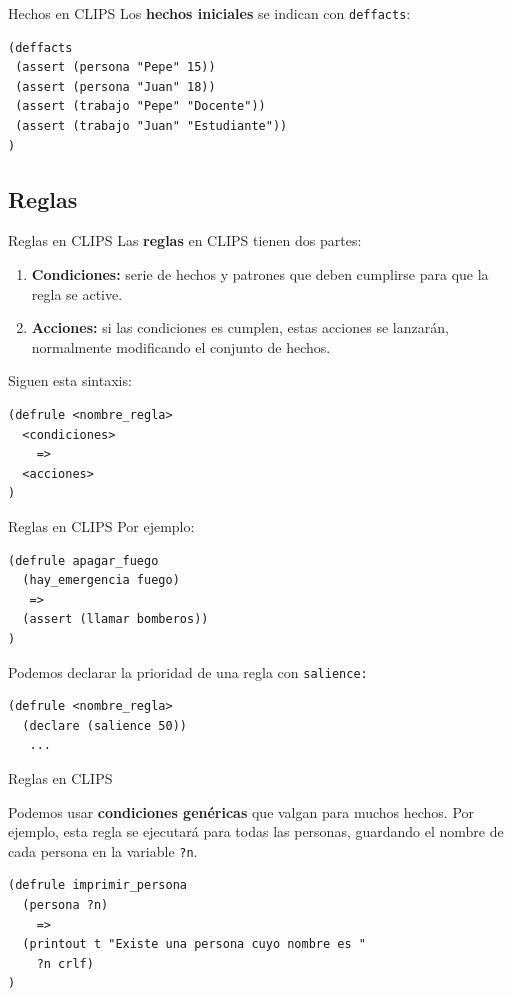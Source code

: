 \documentclass[smaller,spanish,xcolor=svgnames]{beamer}
\begin{document}
\begin{frame}[fragile]{Hechos en CLIPS}
  Los \textbf{hechos iniciales} se indican con \texttt{deffacts}:
\begin{verbatim}
(deffacts
 (assert (persona "Pepe" 15))
 (assert (persona "Juan" 18))
 (assert (trabajo "Pepe" "Docente"))
 (assert (trabajo "Juan" "Estudiante"))
)
\end{verbatim}  
\end{frame}

\subsection{Reglas}

\begin{frame}[fragile]{Reglas en CLIPS}
  Las \textbf{reglas} en CLIPS tienen dos partes:
  \begin{enumerate}
  \item \textbf{Condiciones:} serie de hechos y patrones que deben cumplirse
    para que la regla se active.
  \item \textbf{Acciones:} si las condiciones es cumplen, estas acciones se
    lanzarán, normalmente modificando el conjunto de hechos.
  \end{enumerate}

  \bigskip

  Siguen esta sintaxis:
\begin{verbatim}
(defrule <nombre_regla>
  <condiciones>
    =>
  <acciones>
)
\end{verbatim}
\end{frame}

\begin{frame}[fragile]{Reglas en CLIPS}
  Por ejemplo:
\begin{verbatim}
(defrule apagar_fuego
  (hay_emergencia fuego)
   =>
  (assert (llamar bomberos))
)
\end{verbatim}  

  Podemos declarar la prioridad de una regla con \texttt{salience:}

\begin{verbatim}
(defrule <nombre_regla>
  (declare (salience 50))
   ...
\end{verbatim}    
\end{frame}

\begin{frame}[fragile]{Reglas en CLIPS}

  Podemos usar \textbf{condiciones genéricas} que valgan para muchos
  hechos. Por ejemplo, esta regla se ejecutará para todas las personas, guardando
  el nombre de cada persona en la variable \texttt{?n}.

\begin{verbatim}
(defrule imprimir_persona
  (persona ?n)
    =>
  (printout t "Existe una persona cuyo nombre es " 
    ?n crlf)
)
\end{verbatim}
\end{frame}
\end{document}
